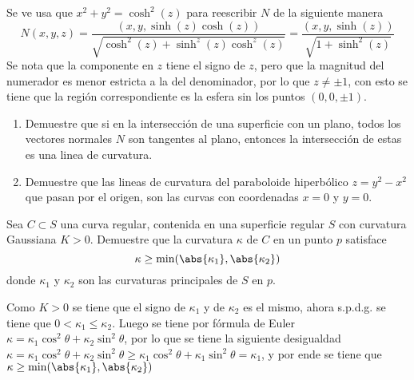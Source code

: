 \documentclass{homework}
\begin{document}
\begin{sol}
\begin{enumerate}
\begin{equation*}
        \end{equation*}
        Se ve usa que \(x^2+y^2=\cosh^2(z)\) para reescribir \(N\) de la siguiente manera
        \begin{equation*}
            N(x,y,z)=\frac{(x,y,\sinh(z)\cosh(z))}{\sqrt{\cosh^2(z)+\sinh^z(z)\cosh^z(z)}}=\frac{(x,y,\sinh(z))}{\sqrt{1+\sinh^2(z)}}
        \end{equation*}
        Se nota que la componente en \(z\) tiene el signo de \(z\), pero que la magnitud del numerador es menor estricta a la del denominador, por lo que \(z\neq\pm1\), con esto se tiene que la región correspondiente es la esfera sin los puntos \((0,0,\pm1)\).
    \end{enumerate}
\end{sol}


\begin{prob}
    \begin{enumerate}
        \item Demuestre que si en la intersección de una superficie con un plano, todos los vectores normales \(N\) son tangentes al plano, entonces la intersección de estas es una linea de curvatura.
        \item Demuestre que las lineas de curvatura del paraboloide hiperbólico \(z=y^2-x^2\) que pasan por el origen, son las curvas con coordenadas \(x=0\) y \(y=0\).
    \end{enumerate}
\end{prob}

\begin{sol}

\end{sol}


\begin{prob}
    Sea \(C\subset S\) una curva regular, contenida en una superficie regular \(S\) con curvatura Gaussiana \(K>0\). Demuestre que la curvatura \(\kappa\) de \(C\) en un punto \(p\) satisface
    \begin{equation*}
        \kappa\geq\min(\abs{\kappa_1},\abs{\kappa_2})
    \end{equation*}
    donde \(\kappa_1\) y \(\kappa_2\) son las curvaturas principales de \(S\) en \(p\).
\end{prob}

\begin{sol}
    Como \(K>0\) se tiene que el signo de \(\kappa_1\) y de \(\kappa_2\) es el mismo, ahora s.p.d.g. se tiene que \(0<\kappa_1\leq\kappa_2\). Luego se tiene por fórmula de Euler \(\kappa=\kappa_1\cos^2\theta+\kappa_2\sin^2\theta\), por lo que se tiene la siguiente desigualdad \(\kappa=\kappa_1\cos^2\theta+\kappa_2\sin^2\theta\geq\kappa_1\cos^2\theta+\kappa_1\sin^2\theta=\kappa_1\), y por ende se tiene que \(\kappa\geq\min(\abs{\kappa_1},\abs{\kappa_2})\)
\end{sol}
\end{document}
